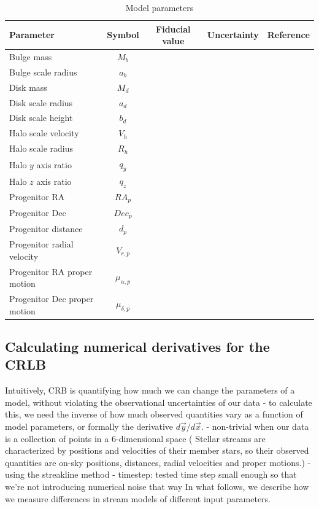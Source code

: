 \documentclass[modern]{aastex61}
\newcommand{\acronym}[1]{{\small{#1}}}
\newcommand{\CRLB}{\acronym{CRLB}}
\begin{document}
\begin{center}
\begin{table}
\begin{tabular}{l c c c l}
\hline
\hline
Parameter & Symbol & Fiducial value & Uncertainty & Reference \\
\hline
\hline
Bulge mass & $M_b$ & & & \\
Bulge scale radius & $a_b$ & & & \\
Disk mass & $M_d$ & & & \\
Disk scale radius & $a_d$ & & & \\
Disk scale height & $b_d$ & & & \\
\hline
Halo scale velocity & $V_h$ & & & \\
Halo scale radius & $R_h$ & & & \\
Halo $y$ axis ratio & $q_y$ & & & \\
Halo $z$ axis ratio & $q_z$ & & & \\
\hline
Progenitor RA & $RA_p$ & & & \\
Progenitor Dec & $Dec_p$ & & & \\
Progenitor distance & $d_p$ & & & \\
Progenitor radial velocity & $V_{r,p}$ & & & \\
Progenitor RA proper motion & $\mu_{\alpha,p}$ & & & \\
Progenitor Dec proper motion & $\mu_{\delta,p}$ & & & \\
\hline
\hline
\end{tabular}
\caption{Model parameters}
\label{t:model}
\end{table}
\end{center}

\subsection{Calculating numerical derivatives for the \CRLB}
\label{sec:derivatives}
Intuitively, CRB is quantifying how much we can change the parameters of a model, without violating the observational uncertainties of our data
- to calculate this, we need the inverse of how much observed quantities vary as a function of model parameters, or formally the derivative $d\vec{y}/d\vec{x}$.
- non-trivial when our data is a collection of points in a 6-dimensional space ( Stellar streams are characterized by positions and velocities of their member stars, so their observed quantities are on-sky positions, distances, radial velocities and proper motions.)
- using the streakline method \citep{bonaca2014}
- timestep: tested time step small enough so that we're not introducing numerical noise that way
In what follows, we describe how we measure differences in stream models of different input parameters.
\end{document}
